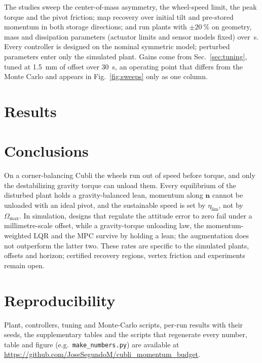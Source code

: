 \documentclass[conference]{IEEEtran}
\theoremstyle{definition}
\theoremstyle{plain}
\begin{document}
\label{sec:verif}
The studies sweep the center-of-mass asymmetry, the wheel-speed limit, the peak
torque and the pivot friction; map recovery over initial tilt and pre-stored
momentum in both storage directions; and run \mcSeeds{} plants with
$\pm\SI{20}{\percent}$ on geometry, mass and dissipation parameters (actuator
limits and sensor models fixed) over \mcHorizon\,\si{\second}.
Every controller is designed on the nominal symmetric model; perturbed
parameters enter only the simulated plant. Gains come from
Sec.~\ref{sec:tuning}, tuned at \SI{1.5}{\milli\metre} of offset over
\SI{30}{\second}, an operating point that differs from the Monte Carlo and
appears in Fig.~\ref{fig:sweeps} only as one column.

\section{Results}
\label{sec:results}



\section{Conclusions}
\label{sec:conclusions}

On a corner-balancing Cubli the wheels run out of speed before torque, and only
the destabilizing gravity torque can unload them. Every equilibrium of the
disturbed plant holds a gravity-balanced lean, momentum along $\boldsymbol n$
cannot be unloaded with an ideal pivot, and the sustainable speed is set by
$\eta_{\lim}$, not by $\Omega_{\max}$. In simulation, designs that regulate
the attitude error to zero fail under a millimetre-scale offset, while a
gravity-torque unloading law, the momentum-weighted LQR and the MPC survive by
holding a lean; the augmentation does not outperform the latter two. These
rates are specific to the simulated plants, offsets and horizon; certified
recovery regions, vertex friction and experiments remain open.

\section*{Reproducibility}
Plant, controllers, tuning and Monte-Carlo scripts, per-run results with their
seeds, the supplementary tables and the scripts that regenerate every number,
table and figure (e.g.\ \texttt{make\_numbers.py}) are available at
\url{https://github.com/JoseSegundoM/cubli_momentum_budget}.

\scriptsize


\end{document}
